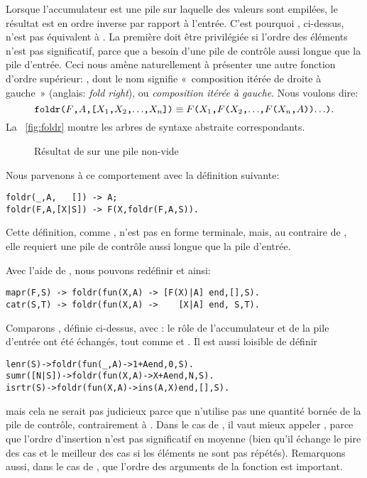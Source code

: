 Lorsque l'accumulateur est une pile sur laquelle des valeurs sont
empilées, le résultat est en ordre inverse par rapport à
l'entrée. C'est pourquoi , ci-dessus, n'est pas
équivalent à . La première doit être privilégiée si
l'ordre des éléments n'est pas significatif, parce que 
a besoin d'une pile de contrôle aussi longue que la pile
d'entrée. Ceci nous amène naturellement à présenter une autre fonction
d'ordre supérieur: , dont le nom signifie
«~composition itérée de droite à gauche~» (anglais: \emph{fold right}),
ou \emph{composition itérée à gauche}. Nous voulons dire:
\begin{equation*}
\texttt{foldr(\(F\),\(A\),[\(X_1\),\(X_2\),\(\ldots\),\(X_{n}\)])}
\equiv
\texttt{\(F\)(\(X_1\),\(F\)(\(X_2\),\(\ldots\),\(F\)(\(X_{n}\),\(A\)))\(\ldots\))}.
\end{equation*}
La \fig~\vref{fig:foldr} montre les arbres de syntaxe abstraite
correspondants.
\begin{figure}
\centering
{}
\qquad
{}
\caption{Résultat de  sur une pile non-vide}
\label{fig:foldr}
\end{figure}
Nous parvenons à ce comportement avec la définition suivante:
\begin{verbatim}
foldr(_,A,   []) -> A;
foldr(F,A,[X|S]) -> F(X,foldr(F,A,S)).
\end{verbatim}
Cette définition, comme , n'est pas en forme
terminale, mais, au contraire de , elle requiert une
pile de contrôle aussi longue que la pile d'entrée.

Avec l'aide de , nous pouvons redéfinir
 et  ainsi:
\begin{verbatim}
mapr(F,S) -> foldr(fun(X,A) -> [F(X)|A] end,[],S).
catr(S,T) -> foldr(fun(X,A) ->    [X|A] end, S,T).
\end{verbatim}
Comparons , définie ci-dessus, avec :
le rôle de l'accumulateur et de la pile d'entrée ont été échangés,
tout comme  et . Il est aussi
loisible de définir
\begin{alltt}
lenr(S)     -> foldr(fun(_,A) -> 1+A end, 0,S).\hfill% \emph{Mauvais}
sumr([N|S]) -> foldr(fun(X,A) -> X+A end, N,S).\hfill% \emph{Mauvais}
isrtr(S)    -> foldr(fun(X,A) -> ins(A,X) end,[],S).\hfill% \emph{Non}
\end{alltt}
mais cela ne serait pas judicieux parce que 
n'utilise pas une quantité bornée de la pile de contrôle,
contrairement à . Dans le cas de , il
vaut mieux appeler , parce que l'ordre d'insertion
n'est pas significatif en moyenne (bien qu'il échange le pire des cas
et le meilleur des cas si les éléments ne sont pas
répétés). Remarquons aussi, dans le cas de , que
l'ordre des arguments de la fonction  est important.

